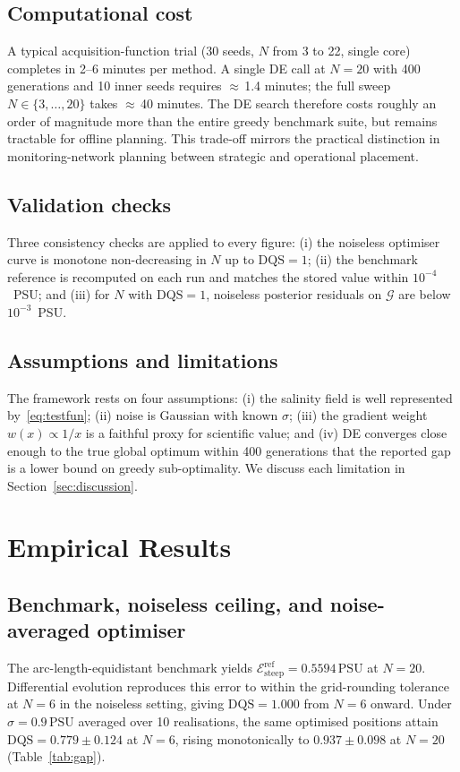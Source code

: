 \documentclass[11pt,letterpaper]{article}
\begin{document}
\subsection{Computational cost}
\label{sec:cost}
A typical acquisition-function trial (30 seeds, $N$ from 3 to 22,
single core) completes in 2--6 minutes per method. A single DE call at
$N=20$ with 400 generations and 10 inner seeds requires
$\approx$\,1.4 minutes; the full sweep $N\in\{3,\dots,20\}$ takes
$\approx$\,40 minutes. The DE search therefore costs roughly an
order of magnitude more than the entire greedy benchmark suite, but
remains tractable for offline planning. This trade-off mirrors the practical
distinction in monitoring-network planning between strategic and
operational placement.

\subsection{Validation checks}
\label{sec:validation}
Three consistency checks are applied to every figure: (i) the noiseless
optimiser curve is monotone non-decreasing in $N$ up to
$\mathrm{DQS}=1$; (ii) the benchmark reference is recomputed on each
run and matches the stored value within $10^{-4}$~PSU; and (iii) for
$N$ with $\mathrm{DQS}=1$, noiseless posterior residuals on
$\mathcal{G}$ are below $10^{-3}$~PSU.

\subsection{Assumptions and limitations}
\label{sec:limitations}
The framework rests on four assumptions: (i) the salinity field is
well represented by~\eqref{eq:testfun}; (ii) noise is
Gaussian with known $\sigma$; (iii) the gradient weight $w(x)\propto
1/x$ is a faithful proxy for scientific value; and (iv) DE converges
close enough to the true global optimum within 400 generations that
the reported gap is a lower bound on greedy sub-optimality. We discuss
each limitation in Section~\ref{sec:discussion}.

\section{Empirical Results}
\label{sec:results}

\subsection{Benchmark, noiseless ceiling, and noise-averaged optimiser}
The arc-length-equidistant benchmark yields
$\mathcal{E}_{\text{steep}}^{\text{ref}}=0.5594\,\mathrm{PSU}$ at $N=20$.
Differential evolution reproduces this error to within the
grid-rounding tolerance at $N=6$ in the noiseless setting, giving
$\mathrm{DQS}=1.000$ from $N=6$ onward. Under $\sigma=0.9\,\mathrm{PSU}$
averaged over 10 realisations, the same optimised positions attain
$\mathrm{DQS}=0.779\pm 0.124$ at $N=6$, rising monotonically to
$0.937\pm 0.098$ at $N=20$ (Table~\ref{tab:gap}).
\end{document}
